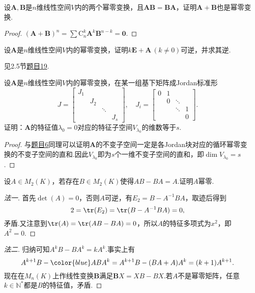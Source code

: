 \begin{prob}[8]
	设$\bm A,\bm B$是$n$维线性空间$V$内的两个幂零变换，且$\bm{AB}=\bm{BA}$，证明$\bm A+\bm B$也是幂零变换.
\end{prob}
\begin{proof}
	$(\bm A+\bm B)^n=\sum\mathrm{C}_n^k\bm A^k\bm B^{n-k}=\bm 0$.
\end{proof}
\begin{prob}[9]
	设$\bm A$是$n$维线性空间$V$内的幂零变换，证明$k\bm E+\bm A\,(k\ne 0)$可逆，并求其逆.
\end{prob}
\begin{sol}
	见2.5节\hyperlink{InverseOfNilpotent}{题目19}.
\end{sol}
\begin{prob}[10]
	设$\bm A$是$n$维线性空间$V$内的幂零变换，在某一组基下矩阵成Jordan标准形
	\[
		J=\begin{bmatrix}
			J_1 &     &        &     \\
			    & J_2 &        &     \\
			    &     & \ddots &     \\
			    &     &        & J_s
		\end{bmatrix},\quad J_i=\begin{bmatrix}
			0 & 1 &        &   \\
			  & 0 & \ddots &   \\
			  &   & \ddots & 1 \\
			  &   &        & 0
		\end{bmatrix}.
	\]
	证明：$\bm A$的特征值$\lambda_0=0$对应的特征子空间$V_{\lambda_0}$的维数等于$s$.
\end{prob}
\begin{proof}
	与\hyperlink{InvariantSubspaceOfNipotent}{题目6}同理可以证明$\bm A$的不变子空间一定是各Jordan块对应的循环幂零变换的不变子空间的直和.因此$V_{\lambda_0}$即为$s$个一维不变子空间的直和，即$\dim V_{\lambda_0}=s$.
\end{proof}
\begin{prob}[11]
	设$A\in M_2(K)$，若存在$B\in M_2(K)$使得$AB-BA=A$.证明$A$幂零.
\end{prob}
\begin{proof}[法一]
	首先$\det(A)=0$，否则$A$可逆，有$E_2=B-A^{-1}BA$，取迹后得到
	\[
		2=\tr(E_2)=\tr(B-A^{-1}BA)=0,
	\]
	矛盾.又注意到$\tr(A)=\tr(AB-BA)=0$，所以$A$的特征多项式为$x^2$，即$A^2=0$.
\end{proof}
\begin{proof}[法二]
	归纳可知$A^kB-BA^k=kA^k$.事实上有
	\[
		A^{k+1}B-{\color{blue}AB}A^k=A^{k+1}B-(BA+A)A^k=(k+1)A^{k+1}.
	\]
	现在在$M_n(K)$上作线性变换$\bm B$满足$\bm BX=XB-BX$.若$A$不是幂零矩阵，任意$k\in\mathbb{N}^*$都是$B$的特征值，矛盾.
\end{proof}
